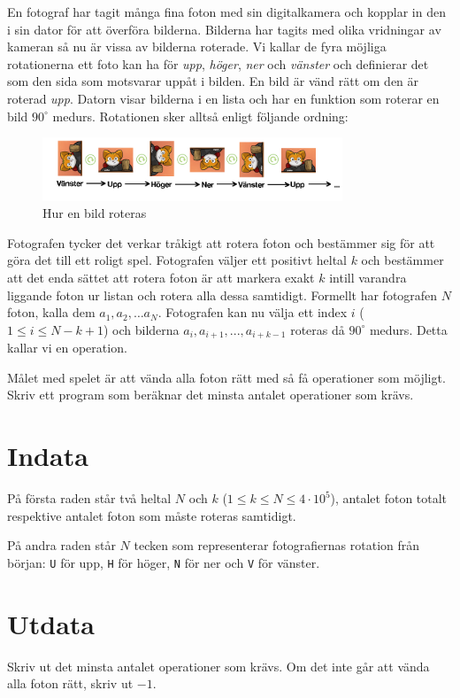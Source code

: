 En fotograf har tagit många fina foton med sin digitalkamera och kopplar in den
i sin dator för att överföra bilderna. Bilderna har tagits med olika vridningar
av kameran så nu är vissa av bilderna roterade. Vi kallar de fyra möjliga
rotationerna ett foto kan ha för \emph{upp}, \emph{höger}, \emph{ner} och \emph{vänster} och
definierar det som den sida som motsvarar uppåt i bilden. En bild är vänd rätt
om den är roterad \emph{upp}. Datorn visar bilderna i en lista och har en funktion
som roterar en bild $90^\circ$ medurs. Rotationen sker alltså enligt följande ordning:

\begin{figure}[h!]
    \centering
    \includegraphics[width=0.8\textwidth]{fotografen.png}
\caption{Hur en bild roteras}
\label{fig:rotatingcat}
\end{figure}


Fotografen tycker det verkar tråkigt att rotera foton och bestämmer sig för att
göra det till ett roligt spel. Fotografen väljer ett positivt heltal $k$ och
bestämmer att det enda sättet att rotera foton är att markera exakt $k$ intill varandra liggande foton ur listan och rotera alla dessa samtidigt. Formellt har fotografen $N$ foton, kalla dem $a_1, a_2, \dots
a_N$. Fotografen kan nu välja ett index $i$ ($1 \leq i \leq N-k+1$)
och bilderna $a_i, a_{i+1}, ... , a_{i+k-1}$ roteras då $90^\circ$ medurs. Detta kallar vi en
operation.

Målet med spelet är att vända alla foton rätt med så få operationer som
möjligt. Skriv ett program som beräknar det minsta antalet operationer som krävs.

\section*{Indata}
På första raden står två heltal $N$ och $k$ ($1 \leq k \leq N \leq 4 \cdot 10 ^5$),
antalet foton totalt respektive antalet foton som måste roteras samtidigt.

På andra raden står $N$ tecken som representerar fotografiernas rotation från
början: \texttt{U} för upp, \texttt{H} för höger, \texttt{N} för ner och
\texttt{V} för vänster.

\section*{Utdata}
Skriv ut det minsta antalet operationer som krävs. Om det inte går att vända
alla foton rätt, skriv ut $-1$.

